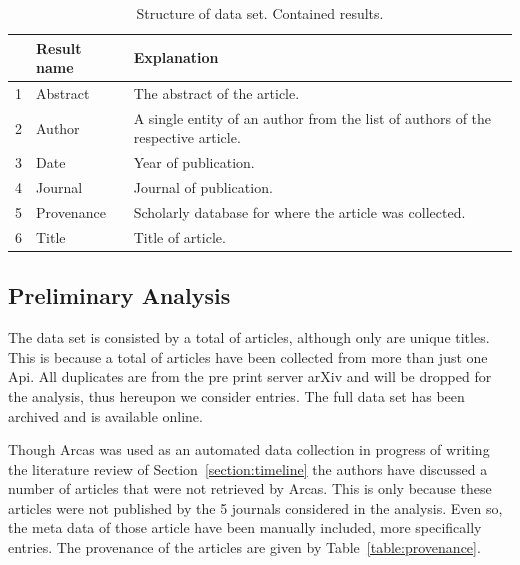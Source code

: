 \documentclass{article}
\newcommand{\totalarticles}{}
\newcommand{\uniquetitles}{}
\newcommand{\numberofduplicates}{}
\newcommand{\manual}{}
\begin{document}
\begin{table}[!hbtp]
    \begin{center}
        \begin{tabular}{lll}
            \toprule
             & Result name & Explanation \\
             \midrule
             1 & Abstract & The abstract of the article.\\ 
             2 & Author & A single entity of an author from the list of 
             authors of the respective article.\\ 
             3 & Date & Year of publication.\\ 
             4 & Journal & Journal of publication.\\               
             5 & Provenance & Scholarly database for where the article was 
             collected.\\                        
             6 & Title & Title of article.\\               
            \bottomrule
        \end{tabular}
    \end{center}
    \caption{Structure of data set. Contained results.}
    \label{table:result_set}
\end{table}

\subsection{Preliminary Analysis}

The data set is consisted by a total of \totalarticles articles, although only
\uniquetitles are unique titles. This is because a total of \numberofduplicates
articles have been collected from more than just one Api. All \numberofduplicates
duplicates are from the pre print server arXiv and will be dropped
for the analysis, thus hereupon we consider \uniquetitles entries. The full
data set has been archived and is available online. %

Though Arcas was used as an automated data collection in progress of writing the
literature review of Section~\ref{section:timeline} the authors have discussed 
a number of articles that were not retrieved by Arcas. This is only because these
articles were not published by the 5 journals considered in the analysis. Even so,
the meta data of those article have been manually included, more specifically
\manual entries. The provenance of the articles are given by Table~\ref{table:provenance}.
\end{document}
